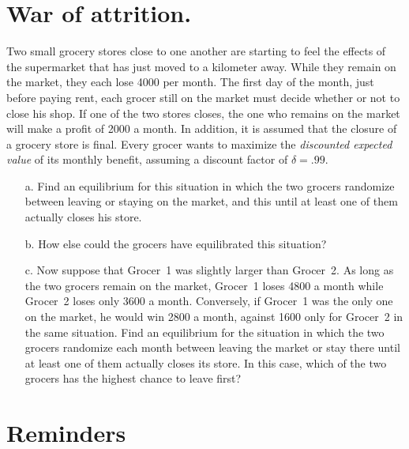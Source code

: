 \documentclass{../ape}
\begin{document}
\section{War of attrition.}
Two small grocery stores close to one another are starting to feel the effects of the supermarket that has just moved to a kilometer away. While they remain on the market, they each lose \SI{4000}{\EUR} per month. The first day of the month, just before paying rent, each grocer still on the market must decide whether or not to close his shop. If one of the two stores closes, the one who remains on the market will make a profit of \SI{2000}{\EUR} a month. In addition, it is assumed that the closure of a grocery store is final. Every grocer wants to maximize the \emph{discounted expected value} of its monthly benefit, assuming a discount factor of $\delta = .99$.
\begin{enumerate}
	\item[a.] Find an equilibrium for this situation in which the two grocers randomize between leaving or staying on the market, and this until at least one of them actually closes his store.
	\item[b.] How else could the grocers have equilibrated this situation?
	\item[c.] Now suppose that Grocer~1 was slightly larger than Grocer~2. As long as the two grocers remain on the market, Grocer~1 loses \SI{4800}{\EUR} a month while Grocer~2 loses only \SI{3600}{\EUR} a month. Conversely, if Grocer~1 was the only one on the market, he would win \SI{2800}{\EUR} a month, against \SI{1600}{\EUR} only for Grocer~2 in the same situation. Find an equilibrium for the situation in which the two grocers randomize each month between leaving the market or stay there until at least one of them actually closes its store. In this case, which of the two grocers has the highest chance to leave first?
\end{enumerate}


\newpage

\section*{Reminders}
\end{document}
